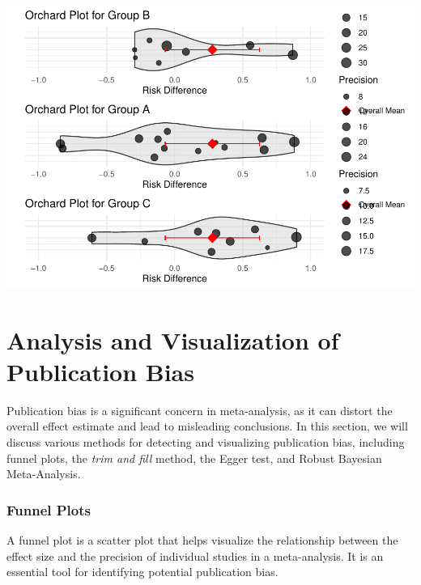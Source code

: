 \documentclass[
]{book}
\begin{document}
\includegraphics{_main_files/figure-latex/unnamed-chunk-32-1.pdf}

\chapter{Analysis and Visualization of Publication Bias}\label{analysis-and-visualization-of-publication-bias}

Publication bias is a significant concern in meta-analysis, as it can distort the overall effect estimate and lead to misleading conclusions. In this section, we will discuss various methods for detecting and visualizing publication bias, including funnel plots, the \emph{trim and fill} method, the Egger test, and Robust Bayesian Meta-Analysis.

\subsection{Funnel Plots}\label{funnel-plots}

A funnel plot is a scatter plot that helps visualize the relationship between the effect size and the precision of individual studies in a meta-analysis. It is an essential tool for identifying potential publication bias.
\end{document}
